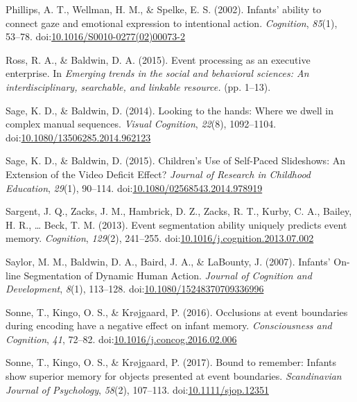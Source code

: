 \documentclass[
  english,
  man,floatsintext]{apa6}
\newlength{\cslhangindent}
\newenvironment{cslreferences}%
  {\setlength{\parindent}{0pt}%
  \everypar{\setlength{\hangindent}{\cslhangindent}}\ignorespaces}%
  {\par}
\begin{document}
\begin{cslreferences}
\leavevmode\hypertarget{ref-phillips_2002}{}%
Phillips, A. T., Wellman, H. M., \& Spelke, E. S. (2002). Infants' ability to connect gaze and emotional expression to intentional action. \emph{Cognition}, \emph{85}(1), 53--78. doi:\href{https://doi.org/10.1016/S0010-0277(02)00073-2}{10.1016/S0010-0277(02)00073-2}

\leavevmode\hypertarget{ref-ross_baldwin_2015}{}%
Ross, R. A., \& Baldwin, D. A. (2015). Event processing as an executive enterprise. In \emph{Emerging trends in the social and behavioral sciences: An interdisciplinary, searchable, and linkable resource.} (pp. 1--13).

\leavevmode\hypertarget{ref-sage_baldwin_2014}{}%
Sage, K. D., \& Baldwin, D. (2014). Looking to the hands: Where we dwell in complex manual sequences. \emph{Visual Cognition}, \emph{22}(8), 1092--1104. doi:\href{https://doi.org/10.1080/13506285.2014.962123}{10.1080/13506285.2014.962123}

\leavevmode\hypertarget{ref-sage_baldwin_2015}{}%
Sage, K. D., \& Baldwin, D. (2015). Children's Use of Self-Paced Slideshows: An Extension of the Video Deficit Effect? \emph{Journal of Research in Childhood Education}, \emph{29}(1), 90--114. doi:\href{https://doi.org/10.1080/02568543.2014.978919}{10.1080/02568543.2014.978919}

\leavevmode\hypertarget{ref-sargent_2013}{}%
Sargent, J. Q., Zacks, J. M., Hambrick, D. Z., Zacks, R. T., Kurby, C. A., Bailey, H. R., \ldots{} Beck, T. M. (2013). Event segmentation ability uniquely predicts event memory. \emph{Cognition}, \emph{129}(2), 241--255. doi:\href{https://doi.org/10.1016/j.cognition.2013.07.002}{10.1016/j.cognition.2013.07.002}

\leavevmode\hypertarget{ref-saylor_2007}{}%
Saylor, M. M., Baldwin, D. A., Baird, J. A., \& LaBounty, J. (2007). Infants' On-line Segmentation of Dynamic Human Action. \emph{Journal of Cognition and Development}, \emph{8}(1), 113--128. doi:\href{https://doi.org/10.1080/15248370709336996}{10.1080/15248370709336996}

\leavevmode\hypertarget{ref-sonne_2016}{}%
Sonne, T., Kingo, O. S., \& Krøjgaard, P. (2016). Occlusions at event boundaries during encoding have a negative effect on infant memory. \emph{Consciousness and Cognition}, \emph{41}, 72--82. doi:\href{https://doi.org/10.1016/j.concog.2016.02.006}{10.1016/j.concog.2016.02.006}

\leavevmode\hypertarget{ref-sonne_2017}{}%
Sonne, T., Kingo, O. S., \& Krøjgaard, P. (2017). Bound to remember: Infants show superior memory for objects presented at event boundaries. \emph{Scandinavian Journal of Psychology}, \emph{58}(2), 107--113. doi:\href{https://doi.org/10.1111/sjop.12351}{10.1111/sjop.12351}


\end{cslreferences}
\end{document}
